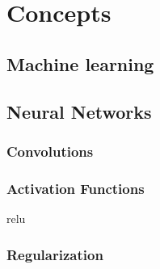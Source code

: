 %
\chapter{Concepts}
\label{sec:concepts}


\section{Machine learning}
\label{sec:concepts:ml}

\section{Neural Networks}
\label{sec:concepts:nn}

\subsection{Convolutions} %
\label{sub:conepts:nn:conv}

\subsection{Activation Functions} %
\label{sub:conepts:nn:activations}
\gls{relu}

\subsection{Regularization} %
\label{sub:conepts:nn:regularization}

